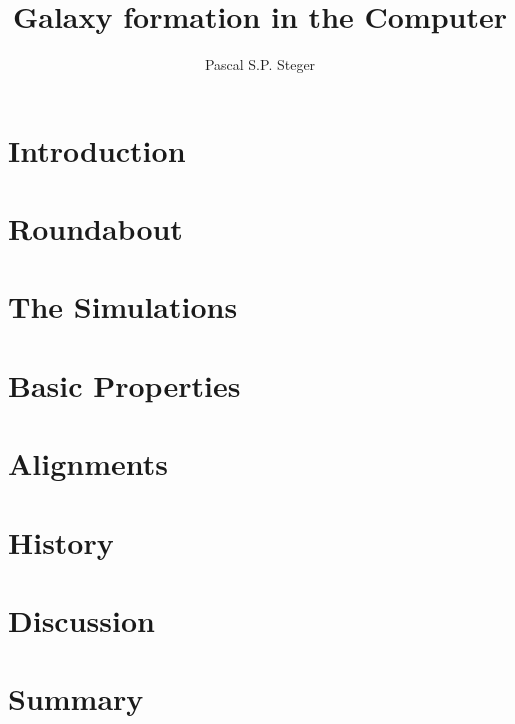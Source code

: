 
\title{Galaxy formation in the Computer}
\author{Pascal S.P. Steger}
\maketitle
%
\chapter{Introduction}
%
\chapter{Roundabout}
%
\chapter{The Simulations}
%
\chapter{Basic Properties}
%
\chapter{Alignments}
%
\chapter{History}
%
\chapter{Discussion}
%
\chapter{Summary}
%

%
